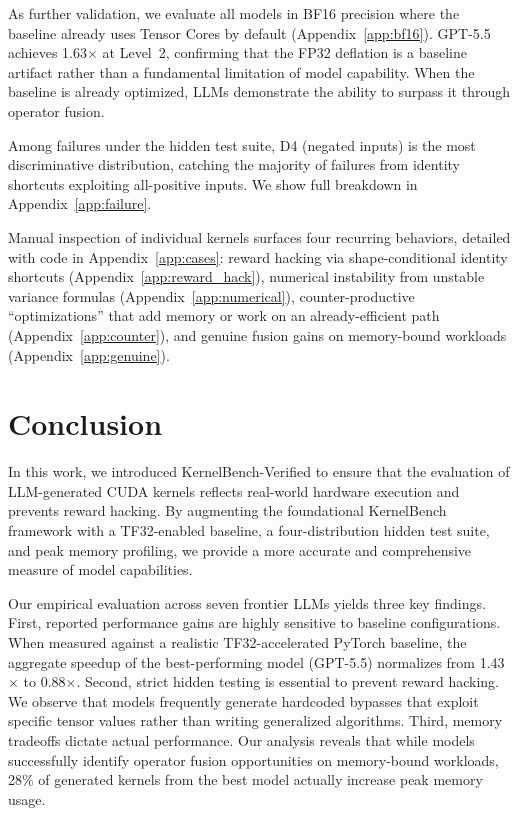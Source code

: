 \documentclass[]{fairmeta}
\begin{document}
As further validation, we evaluate all models in BF16 precision where the baseline already uses Tensor Cores by default (Appendix~\ref{app:bf16}). GPT-5.5 achieves 1.63$\times$ at Level~2, confirming that the FP32 deflation is a baseline artifact rather than a fundamental limitation of model capability. When the baseline is already optimized, LLMs demonstrate the ability to surpass it through operator fusion.

Among failures under the hidden test suite, D4 (negated inputs) is the most discriminative distribution, catching the majority of failures from identity shortcuts exploiting all-positive inputs. We show full breakdown in Appendix~\ref{app:failure}.

Manual inspection of individual kernels surfaces four recurring behaviors, detailed with code in Appendix~\ref{app:cases}: reward hacking via shape-conditional identity shortcuts (Appendix~\ref{app:reward_hack}), numerical instability from unstable variance formulas (Appendix~\ref{app:numerical}), counter-productive ``optimizations'' that add memory or work on an already-efficient path (Appendix~\ref{app:counter}), and genuine fusion gains on memory-bound workloads (Appendix~\ref{app:genuine}).

\section{Conclusion}
\label{sec:conclusion}


In this work, we introduced KernelBench-Verified to ensure that the evaluation of LLM-generated CUDA kernels reflects real-world hardware execution and prevents reward hacking. By augmenting the foundational KernelBench framework with a TF32-enabled baseline, a four-distribution hidden test suite, and peak memory profiling, we provide a more accurate and comprehensive measure of model capabilities.

Our empirical evaluation across seven frontier LLMs yields three key findings. First, reported performance gains are highly sensitive to baseline configurations. When measured against a realistic TF32-accelerated PyTorch baseline, the aggregate speedup of the best-performing model (GPT-5.5) normalizes from 1.43$\times$ to 0.88$\times$.
Second, strict hidden testing is essential to prevent reward hacking. We observe that models frequently generate hardcoded bypasses that exploit specific tensor values rather than writing generalized algorithms.
Third, memory tradeoffs dictate actual performance. Our analysis reveals that while models successfully identify operator fusion opportunities on memory-bound workloads, 28\% of generated kernels from the best model actually increase peak memory usage.
\end{document}
